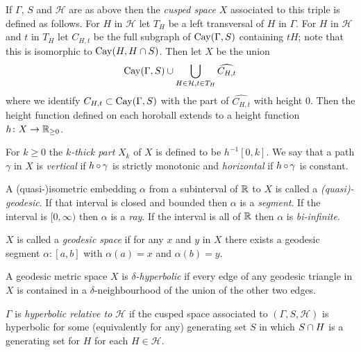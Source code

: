 \begin{defn}\label{defn:cuspedspace} If $\Gamma$, $S$ and $\mathcal{H}$ are as
above then the \emph{cusped space} $X$ associated to this triple is defined
as follows. For $H$ in $\mathcal{H}$ let $T_H$ be a left transversal of $H$
in $\Gamma$. For $H$ in $\mathcal{H}$ and $t$ in $T_H$ let $C_{H, t}$ be the
full subgraph of $\operatorname{\mathrm{Cay}}(\Gamma, S)$ containing $tH$; note that this is
isomorphic to $\operatorname{\mathrm{Cay}}(H, H \cap S)$. Then let $X$ be the union
\begin{align*}
  \operatorname{\mathrm{Cay}}(\Gamma, S) \cup \bigcup_{H\in\mathcal{H}, t \in T_H} \widehat{C_{H, t}}
\end{align*}
where we identify $C_{H, t} \subset \operatorname{\mathrm{Cay}}(\Gamma, S)$ with the part of
$\widehat{C_{H, t}}$ with height 0. Then the height function defined on each
horoball extends to a height function $h \colon X \to \mathbb{R}_{\geq 0}$. 

For $k \geq 0$ the \emph{$k$-thick part} $X_k$ of $X$ is defined to be $h^{-1}[0, k]$.
We say that a path $\gamma$ in $X$ is \emph{vertical} if $h \operatorname{\circ} \gamma$
is strictly monotonic and \emph{horizontal} if $h \operatorname{\circ} \gamma$ is
constant. \end{defn} 

\begin{defn} A (quasi-)isometric embedding $\alpha$ from a subinterval of
$\mathbb{R}$ to $X$ is called a \emph{(quasi)-geodesic}. If that interval is
closed and bounded then $\alpha$ is a \emph{segment}. If the interval is $[0,
\infty)$ then $\alpha$ is a \emph{ray}. If the interval is all of $\mathbb{R}$
then $\alpha$ is \emph{bi-infinite}.

$X$ is called a \emph{geodesic space} if for any $x$ and $y$ in $X$ there
exists a geodesic segment $\alpha \colon [a, b]$ with $\alpha(a) = x$ and
$\alpha(b) = y$.\end{defn}

\begin{defn}\label{defn:hyperbolic} A geodesic metric space $X$ is
\emph{$\delta$-hyperbolic} if every edge of any geodesic triangle in $X$ is
contained in a $\delta$-neighbourhood of the union of the other two edges.
\end{defn}

\begin{defn}\label{defn:relativelyhyperbolic} $\Gamma$ is \emph{hyperbolic
relative to $\mathcal{H}$} if the cusped space associated to $(\Gamma, S,
\mathcal{H})$ is hyperbolic for some (equivalently for any) generating set
$S$ in which $S \cap H$ is a generating set for $H$ for each $H \in
\mathcal{H}$. \end{defn}

